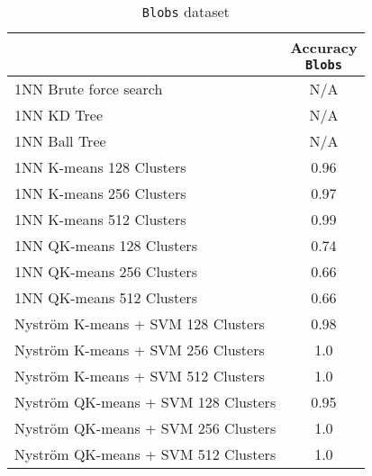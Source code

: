 \begin{table*}[!htb]
\begin{adjustbox}{center, max width=0.9\textwidth}

\begin{subtable}{.5\textwidth}
\begin{tabular}{@{}lc}
\toprule
                                    & \thead{Accuracy \\ \texttt{Blobs}} \\ \midrule
1NN Brute force search              & N/A   \\
1NN KD Tree                         & N/A   \\
1NN Ball Tree                       & N/A   \\ \midrule \midrule
1NN K-means 128 Clusters            & 0.96      \\
1NN K-means 256 Clusters            & 0.97      \\
1NN K-means 512 Clusters            & 0.99      \\ \midrule
1NN QK-means 128 Clusters           & 0.74     \\
1NN QK-means 256 Clusters           & 0.66      \\
1NN QK-means 512 Clusters           & 0.66      \\ \midrule \midrule
Nyström K-means + SVM 128 Clusters  & 0.98      \\
Nyström K-means + SVM 256 Clusters  & 1.0      \\
Nyström K-means + SVM 512 Clusters  & 1.0      \\ \midrule
Nyström QK-means + SVM 128 Clusters & 0.95      \\
Nyström QK-means + SVM 256 Clusters & 1.0      \\
Nyström QK-means + SVM 512 Clusters & 1.0      \\ \bottomrule
\end{tabular}
\caption{\texttt{Blobs} dataset}


\end{subtable}
\end{adjustbox}
\end{table*}
